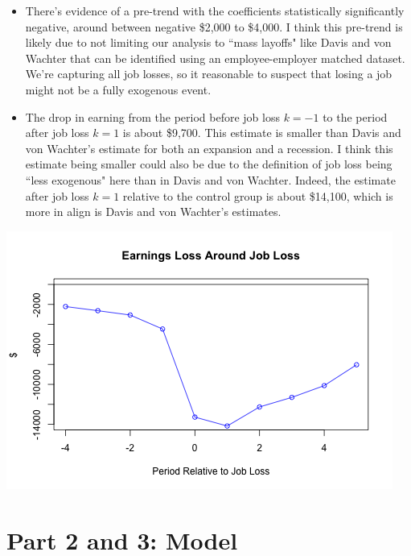\documentclass{article}
\begin{document}
\begin{itemize}
\begin{itemize}
\item There's evidence of a pre-trend with the coefficients statistically significantly negative, around between negative \$2,000 to \$4,000.  I think this pre-trend is likely due to not limiting our analysis to ``mass layoffs" like Davis and von Wachter that can be identified using an employee-employer matched dataset.  We're capturing all job losses, so it reasonable to suspect that losing a job might not be a fully exogenous event.
\item The drop in earning from the period before job loss $k = -1$ to the period after job loss $k = 1$ is about \$9,700.  This estimate is smaller than Davis and von Wachter's estimate for both an expansion and a recession. I think this estimate being smaller could also be due to the definition of job loss being ``less exogenous" here than in Davis and von Wachter.  Indeed, the estimate after job loss $k=1$ relative to the control group is about \$14,100, which is more in align is Davis and von Wachter's estimates.
\end{itemize}

\end{itemize}

\includegraphics{part_1.png}

\pagebreak

\section{Part 2 and 3: Model}
\end{document}
